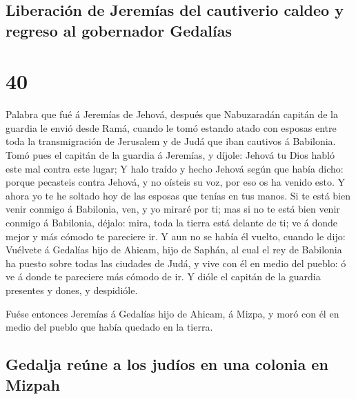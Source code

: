 \hypertarget{liberaciuxf3n-de-jeremuxedas-del-cautiverio-caldeo-y-regreso-al-gobernador-gedaluxedas}{%
\subsection{Liberación de Jeremías del cautiverio caldeo y regreso al
gobernador
Gedalías}\label{liberaciuxf3n-de-jeremuxedas-del-cautiverio-caldeo-y-regreso-al-gobernador-gedaluxedas}}

\hypertarget{section-39}{%
\section{40}\label{section-39}}

 Palabra que fué á Jeremías de Jehová, después que
Nabuzaradán capitán de la guardia le envió desde Ramá, cuando le tomó
estando atado con esposas entre toda la transmigración de Jerusalem y de
Judá que iban cautivos á Babilonia.  Tomó pues el capitán
de la guardia á Jeremías, y díjole: Jehová tu Dios habló este mal contra
este lugar;  Y halo traído y hecho Jehová según que había
dicho: porque pecasteis contra Jehová, y no oísteis su voz, por eso os
ha venido esto.  Y ahora yo te he soltado hoy de las
esposas que tenías en tus manos. Si te está bien venir conmigo á
Babilonia, ven, y yo miraré por ti; mas si no te está bien venir conmigo
á Babilonia, déjalo: mira, toda la tierra está delante de ti; ve á donde
mejor y más cómodo te pareciere ir.  Y aun no se había él
vuelto, cuando le dijo: Vuélvete á Gedalías hijo de Ahicam, hijo de
Saphán, al cual el rey de Babilonia ha puesto sobre todas las ciudades
de Judá, y vive con él en medio del pueblo: ó ve á donde te pareciere
más cómodo de ir. Y dióle el capitán de la guardia presentes y dones, y
despidióle.

 Fuése entonces Jeremías á Gedalías hijo de Ahicam, á
Mizpa, y moró con él en medio del pueblo que había quedado en la tierra.

\hypertarget{gedalja-reuxfane-a-los-juduxedos-en-una-colonia-en-mizpah}{%
\subsection{Gedalja reúne a los judíos en una colonia en
Mizpah}\label{gedalja-reuxfane-a-los-juduxedos-en-una-colonia-en-mizpah}}

